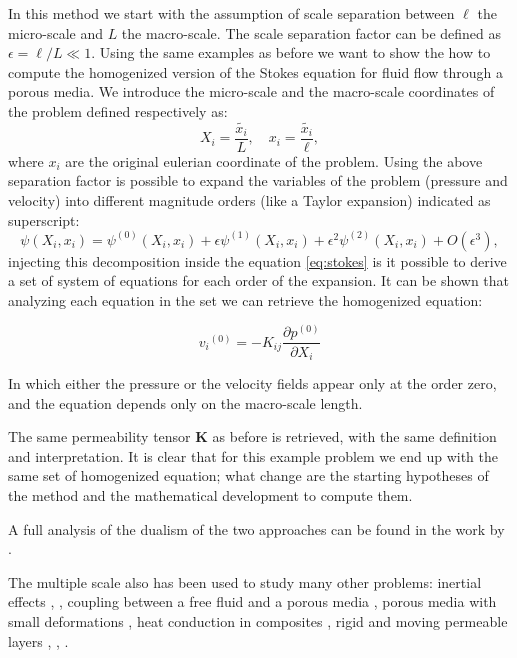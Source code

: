 In this method we start with the assumption of scale separation between $\ell$ the micro-scale and $L$ the macro-scale.
The scale separation factor can be defined as $\epsilon = \ell/L \ll 1$.
Using the same examples as before we want to show the how to compute the homogenized version of the Stokes equation for fluid flow through a porous media.
We introduce the micro-scale and the macro-scale coordinates of the problem defined respectively as:
$$
 X_i = \dfrac{\tilde{x_i}}{L}, \quad   x_i = \dfrac{\tilde{x_i}}{\ell},
$$
where $x_i$ are the original eulerian coordinate of the problem.
Using the above separation factor is possible to expand the variables of the problem (pressure and velocity) into different magnitude orders (like a Taylor expansion) indicated as superscript:
$$
\psi(X_i, x_i) = \psi^{(0)}(X_i, x_i)  +\epsilon \psi^{(1)}(X_i, x_i) +\epsilon^2 \psi^{(2)}(X_i, x_i) +O(\epsilon^3),
$$
injecting this decomposition inside the equation \eqref{eq:stokes} is it possible to derive a set of system of equations for each order of the expansion.
It can be shown that analyzing each equation in the set we can retrieve the homogenized equation:

\begin{equation}
{v_i}^{(0)} = -K_{ij} \dfrac{\partial p^{(0)}}{\partial X_i}
\label{eq:darcy_ms}
\end{equation} 

In which either the pressure or the velocity fields appear only at the order zero, and the equation depends only on the macro-scale length.

The same permeability tensor $\mathbf{K}$ as before is retrieved, with the same definition and interpretation.
It is clear that for this example problem we end up with the same set of homogenized equation; what change are the starting hypotheses of the method and the mathematical development to compute them.

A full analysis of the dualism of the two approaches can be found in the work by \citet{davit2013homogenization}.

The multiple scale also has been used to study many other problems: inertial effects \citet{mei1991effect}, \citet{skjetne1999new}, coupling between a free fluid and a porous media \citet{mikelic2000interface}, porous media with small deformations \citet{auriault1977etude}, heat conduction in composites \citet{auriault1983effective}, rigid and moving permeable layers \citet{zampogna2016fluid}, \citet{ugis}, \citet{zampogna2017pelskin}.

